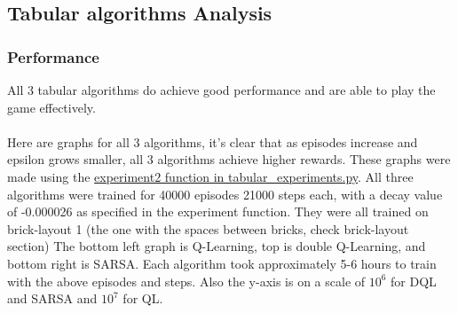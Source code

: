 \documentclass[twoside,11pt]{article}
\begin{document}
\subsection{Tabular algorithms Analysis} 
\subsubsection{Performance}
All 3 tabular algorithms do achieve good performance and are able to play the game effectively.
\\\\
Here are graphs for all 3 algorithms, it's clear that as episodes increase and epsilon grows smaller, all 3 algorithms achieve higher rewards. These graphs were made using the \href{https://github.com/duoduocai-dot/csc498-project/blob/main/tabular_experiments.py#L125}{experiment2 function in tabular\_experiments.py}. All three algorithms were trained for 40000 episodes 21000 steps each, with a decay value of -0.000026 as specified in the experiment function. They were all trained on brick-layout 1 (the one with the spaces between bricks, check brick-layout section) The bottom left graph is Q-Learning, top is double Q-Learning, and bottom right is SARSA. Each algorithm took approximately 5-6 hours to train with the above episodes and steps. Also the y-axis is on a scale of $10^6$ for DQL and SARSA and $10^7$ for QL.
\end{document}

